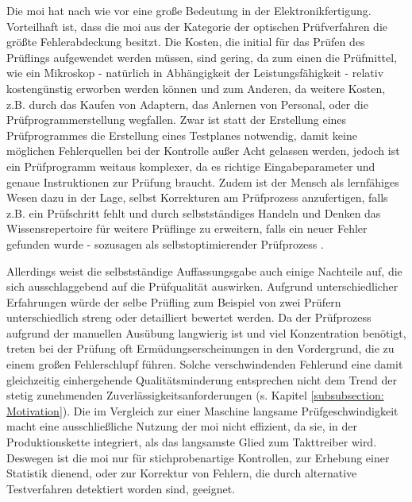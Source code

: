         Die \ac{moi} hat nach wie vor eine große Bedeutung in der Elektronikfertigung.
        Vorteilhaft ist, dass die \ac{moi} aus der Kategorie der optischen Prüfverfahren die größte Fehlerabdeckung besitzt. 
        Die Kosten, die initial für das Prüfen des Prüflings aufgewendet werden müssen, sind gering, da zum einen die Prüfmittel, wie ein Mikroskop - natürlich in Abhängigkeit der Leistungsfähigkeit - relativ kostengünstig erworben werden können und zum Anderen, da weitere Kosten, z.B. durch das Kaufen von Adaptern, das Anlernen von Personal, oder die Prüfprogrammerstellung wegfallen. \cite{berger_test-_2012}
        Zwar ist statt der Erstellung eines Prüfprogrammes die Erstellung eines Testplanes notwendig, damit keine möglichen Fehlerquellen bei der Kontrolle außer Acht gelassen werden, jedoch ist ein Prüfprogramm weitaus komplexer, da es richtige Eingabeparameter und genaue Instruktionen zur Prüfung braucht.
        Zudem ist der Mensch als lernfähiges Wesen dazu in der Lage, selbst Korrekturen am Prüfprozess anzufertigen, falls z.B. ein Prüfschritt fehlt und durch selbstständiges Handeln und Denken das Wissensrepertoire für weitere Prüflinge zu erweitern, falls ein neuer Fehler gefunden wurde - sozusagen als selbstoptimierender Prüfprozess \cite{berger_test-_2012}.

        Allerdings weist die selbstständige Auffassungsgabe auch einige Nachteile auf, die sich ausschlaggebend auf die Prüfqualität auswirken.
        Aufgrund unterschiedlicher Erfahrungen würde der selbe Prüfling zum Beispiel von zwei Prüfern unterschiedlich streng oder detailliert bewertet werden.
        Da der Prüfprozess aufgrund der manuellen Ausübung langwierig ist und viel Konzentration benötigt, treten bei der Prüfung oft Ermüdungserscheinungen in den Vordergrund, die zu einem großen Fehlerschlupf führen.
        Solche \glqq verschwindenden Fehler\grqq\@ und eine damit gleichzeitig einhergehende Qualitätsminderung entsprechen nicht dem Trend der stetig zunehmenden Zuverlässigkeitsanforderungen (s. Kapitel \ref{subsubsection: Motivation}).
        Die im Vergleich zur einer Maschine langsame Prüfgeschwindigkeit macht eine ausschließliche Nutzung der \ac{moi} nicht effizient, da sie, in der Produktionskette integriert, als das langsamste Glied zum Takttreiber wird.
        Deswegen ist die \ac{moi} nur für stichprobenartige Kontrollen, zur Erhebung einer Statistik dienend, oder zur Korrektur von Fehlern, die durch alternative Testverfahren detektiert worden sind, geeignet. \cite{berger_test-_2012}

